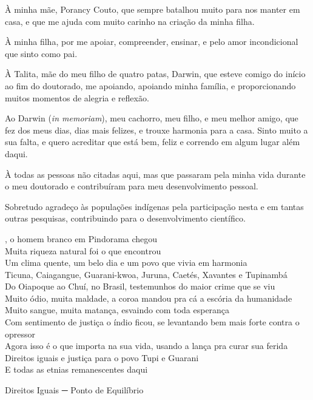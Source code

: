 \documentclass[12pt,openright,twoside,a4paper,sumario=tradicional,english,brazil]{abntex2}
\begin{document}
\begin{agradecimentos}
À minha mãe, Porancy Couto, que sempre batalhou muito para nos manter em casa, e que me ajuda com muito carinho na criação da minha filha.

À minha filha, por me apoiar, compreender, ensinar, e pelo amor incondicional que sinto como pai.

À Talita, mãe do meu filho de quatro patas, Darwin, que esteve comigo do início ao fim do doutorado, me apoiando, apoiando minha família, e proporcionando muitos momentos de alegria e reflexão.

Ao Darwin (\emph{in memoriam}), meu cachorro, meu filho, e meu melhor amigo, que fez dos meus dias, dias mais felizes, e trouxe harmonia para a casa. Sinto muito a sua falta, e quero acreditar que está bem, feliz e correndo em algum lugar além daqui. 

À todas as pessoas não citadas aqui, mas que passaram pela minha vida durante o meu doutorado e contribuíram para meu desenvolvimento pessoal.

Sobretudo agradeço às populações indígenas pela participação nesta e em tantas outras pesquisas, contribuindo para o desenvolvimento científico.


\end{agradecimentos}


\begin{epigrafe}
    \vspace*{\fill}
    
    , o homem branco em Pindorama chegou \\
    Muita riqueza natural foi o que encontrou \\
    Um clima quente, um belo dia e um povo que vivia em harmonia \\
    Ticuna, Caiagangue, Guarani-kwoa, Juruna, Caetés, Xavantes e Tupinambá \\
    Do Oiapoque ao Chuí, no Brasil, testemunhos do maior crime que se viu \\
    Muito ódio, muita maldade, a coroa mandou pra cá a escória da humanidade \\
    Muito sangue, muita matança, esvaindo com toda esperança \\
    Com sentimento de justiça o índio ficou, se levantando bem mais forte contra o opressor \\
    Agora isso é o que importa na sua vida, usando a lança pra curar sua ferida \\
    
    \noindent
    Direitos iguais e justiça para o povo Tupi e Guarani \\
    E todas as etnias remanescentes daqui
    
	\begin{flushright}
        Direitos Iguais ─ Ponto de Equilíbrio
	\end{flushright}
\end{epigrafe}
\end{document}
